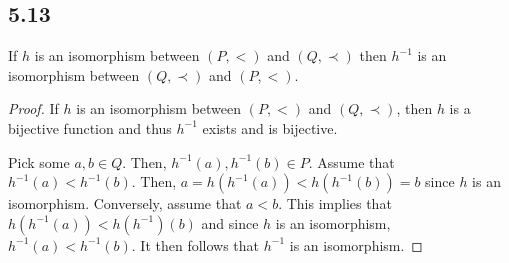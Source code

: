 \subsection*{5.13} If $h$ is an isomorphism between $(P, <)$ and $(Q, \prec)$ then $h^{-1}$ is an isomorphism between $(Q, \prec)$ and $(P, <)$.

\begin{proof}
If $h$ is an isomorphism between $(P, <)$ and $(Q, \prec)$, then $h$ is a bijective function and thus $h^{-1}$ exists and is bijective.

Pick some $a, b \in Q$. Then, $h^{-1}(a), h^{-1}(b) \in P$. Assume that $h^{-1}(a) < h^{-1}(b)$. Then, $a = h(h^{-1}(a)) < h(h^{-1}(b)) = b$ since $h$ is an isomorphism. Conversely, assume that $a < b$. This implies that $h(h^{-1}(a)) < h(h^{-1})(b)$ and since $h$ is an isomorphism, $h^{-1}(a) < h^{-1}(b)$. It then follows that $h^{-1}$ is an isomorphism.


\end{proof}

